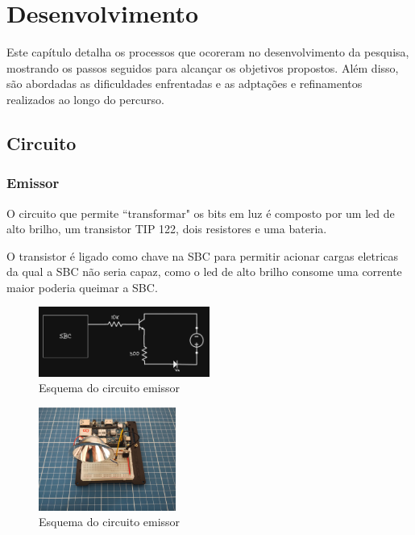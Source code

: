 \chapter{Desenvolvimento}

Este capítulo detalha os processos que ocoreram no desenvolvimento da pesquisa, mostrando os passos seguidos para alcançar os objetivos propostos. Além disso, são abordadas as dificuldades enfrentadas e as adptações e refinamentos realizados ao longo do percurso.

\section{Circuito}

\subsection{Emissor}

O circuito que permite ``transformar" os bits em luz é composto por um led de alto brilho, um transistor TIP 122, dois resistores e uma bateria.

O transistor é ligado como chave na SBC para permitir acionar cargas eletricas da qual a SBC não seria capaz, como o led de alto brilho consome uma corrente maior poderia queimar a SBC.

\begin{figure}[!htbp]
  \includegraphics[width=0.5\textwidth]{images/esquema_circuito_emisor.png}
  \caption{Esquema do circuito emissor}
  \label{esquema-circuito-emissor}
\end{figure}

\begin{figure}[!htbp]
  \includegraphics[width=0.4\textwidth]{images/foto_circuito_emisor.jpg}
  \caption{Esquema do circuito emissor}
  \label{foto-circuito-emissor}
\end{figure}


